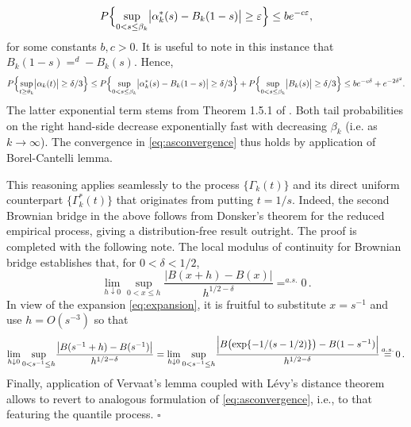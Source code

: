 \documentclass[11pt, a4paper, oneside]{article}
\numberwithin{equation}{section}
\theoremstyle{plain}
\theoremstyle{definition}
\newenvironment{pfofLem}{\noindent{\bf Proof of Lemma}}{\hfill $\square$ \\}
\newcommand{\id}{\ensuremath{\displaystyle{\mathop {=} ^d}}}
\newcommand{\suprem}[1]{\ensuremath{\displaystyle {\sup_{#1}}}}
\begin{document}
\begin{pfofLem}{~\ref{Lem:BasicEmpProcess}:}
\begin{equation*}
	P \Bigl\{ \suprem{0< s \leq \beta_k} \bigl| \alpha^*_k(s) - B_k(1-s)\bigr| \geq \varepsilon \Bigr\}  \leq b e^{-c \varepsilon},
\end{equation*}
for some constants $b, c >0$. It is useful to note in this instance that $B_k(1-s) \id -B_k(s)$. Hence,
\begin{equation*}
	P \Bigl\{ \suprem{t \geq \theta_k} \bigl| \alpha_k(t) \bigr| \geq \delta/3 \Bigr\} \leq P \Bigl\{ \suprem{0< s \leq \beta_k} \bigl| \alpha^*_k(s) - B_k(1-s)\bigr| \geq \delta/3 \Bigr\} + P \Bigl\{ \suprem{0<s \leq \beta_k} \bigl| B_k(s)\bigr| \geq \delta/3 \Bigr\} \leq b e^{-c \delta } + e^{-2 \delta ^2 }.
\end{equation*}
The latter exponential term stems from Theorem 1.5.1 of \citet{CsorgoRevesz1981}. Both tail probabilities on the right hand-side decrease exponentially fast with decreasing $\beta_k$ (i.e. as $k\rightarrow \infty$).
 The convergence in \eqref{eq:asconvergence} thus holds by application of Borel-Cantelli lemma.

\noindent This reasoning applies seamlessly to the process $\{\Gamma_k(t)\}$ and its direct uniform counterpart $\{\Gamma^*_k(t)\}$ that originates from putting $t=1/s$. Indeed, the second Brownian bridge in the above follows from Donsker's theorem for the reduced empirical process, giving a distribution-free result outright. The proof is completed with the following note.
The local modulus of continuity for Brownian bridge \citep[Theorem 1.9.1 in][]{CsorgoRevesz1981} establishes that, for $0<\delta<1/2$,
\begin{equation*}
           \lim_{h\downarrow 0}\suprem{0<x \leq h}\frac{\bigl|B(x+h)-B(x)\bigl|}{h^{1/2-\delta}} \mathop{=}^{a.s.} 0 \,.
\end{equation*}
In view of the expansion \eqref{eq:expansion}, it is fruitful to substitute $x=s^{-1}$ and use $h=O(s^{-3})$ so that
\begin{equation*}
            \lim_{h\downarrow 0}\suprem{0<s^{-1} \leq h}\frac{\bigl|B(s^{-1}+h)-B(s^{-1})\bigl|}{h^{1/2-\delta}}= \lim_{h\downarrow 0}\suprem{0<s^{-1} \leq h}\frac{\Bigl|B\bigl( \exp\{-1/(s-1/2)\}\bigr)-B(1-s^{-1})\Bigl|}{h^{1/2-\delta}}\mathop{=}^{a.s.} 0 \,.
\end{equation*}
Finally, application of Vervaat's lemma \citep[see][Proposition 3.3]{Resnick2007} coupled with L\'evy's distance theorem allows to revert to analogous formulation of \eqref{eq:asconvergence}, i.e., to that featuring the quantile process.
\end{pfofLem}
\end{document}
